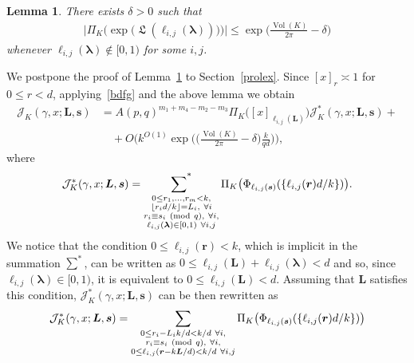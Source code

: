 \documentclass[11pt]{amsart}
\newcommand{\br}{{\boldsymbol r}}
\newcommand{\J}{\mathcal{J}}
\renewcommand{\mod}[1]{~\pr{\textnormal{mod}~#1}}
\newtheorem{lemma}{Lemma}
\theoremstyle{definition}
\newcommand{\ssum}[1]{\sum_{\substack{#1}}}
\newcommand{\ssumstar}[1]{\operatornamewithlimits{\sum\nolimits^*}_{\substack{#1}}}
\newcommand{\pr}[1]{\mathchoice{\left( #1\right)}{(#1)}{(#1)}{(#1)}}
\newcommand{\floor}[1]{{\left\lfloor {#1} \right\rfloor}}
\DeclareMathOperator{\Lie}{{\mathfrak L}}
\DeclareMathOperator{\Vol}{Vol}
\newcommand{\bs}{\boldsymbol }
\newcommand{\1}{{\mathbf 1}}
\let\originalleft\left
\let\originalright\right
\renewcommand{\left}{\mathopen{}\mathclose\bgroup\originalleft}
\renewcommand{\right}{\aftergroup\egroup\originalright}
\numberwithin{equation}{section}
\begin{document}
\begin{lemma}\label{extra_terms}
  There exists $\delta>0$ such that
  \begin{align*}
    \bigg|\Pi_K\big(\exp\big(\Lie(\ell_{i,j}(\bs \lambda))\big) \big)\bigg| \leq  \exp\Big(\frac{\Vol(K)}{2\pi}-\delta\Big)
  \end{align*}
  whenever $\ell_{i,j}(\bs \lambda)\notin[0,1)$ for some $i,j$.
\end{lemma}

We postpone the proof of Lemma~\ref{extra_terms} to Section~\ref{prolex}. Since $[x]_{r}\asymp 1$ for $0\leq r<d$, applying~\eqref{bdfg}
and the above lemma we obtain
\begin{equation}
  \begin{split}\label{reme}
    \J_K(\gamma, x ; \boldsymbol L,\boldsymbol s) &=  A(p,q)^{m_1+m_4-m_2-m_3}
    \Pi_K\big([ x]_{ \ell_{i,j}(\boldsymbol L) }\big)
    \J^*_K(\gamma, x; \boldsymbol L,\boldsymbol s)+{}\\
    &\quad+O\bigg(k^{O(1)}\exp\Big(\Big(\frac{\Vol(K)}{2\pi}-\delta\Big)\frac{k}{qd}\Big)\bigg),
  \end{split}
\end{equation}
where
\begin{align*}
  \J^*_K(\gamma, x; \boldsymbol L,\boldsymbol s) =    \ssumstar{0\leq r_1,\dots, r_m<k,\\  \floor{r_i d/k}=L_i,\ \forall i\\ r_i\equiv s_i \mod{q},\ \forall i,\\ 
    \ell_{i,j}(\bs \lambda)\in[0,1)\ \forall i,j }
  \Pi_K\big(\Phi_{\ell_{i,j}(\boldsymbol s)}(\{\ell_{i,j}(\boldsymbol r) d/k\})\big).
\end{align*}
We notice that the condition $0\leq \ell_{i,j}(\br)<k$, which is implicit in the summation $\sum^*$, can be written as $0\leq \ell_{i,j}(\bs L)+\ell_{i,j}(\bs \lambda)<d$ and so, since $\ell_{i,j}(\bs \lambda)\in[0,1)$, it is equivalent to $0\leq \ell_{i,j}(\bs L)<d$. Assuming that $\bs L$ satisfies this condition, $\J^*_K(\gamma, x; \boldsymbol L,\boldsymbol s)$ can be then rewritten as 
\begin{align*}
  \J^{*}_K(\gamma, x; \boldsymbol L,\boldsymbol s) =    \ssum{0 \leq r_i-L_i k/d< k/d\ \forall i,\\  r_i\equiv s_i \mod{q},\ \forall i,\\ 
    0\leq \ell_{i,j}(\br -k \bs L/d)<k/d\ \forall i,j }
  \Pi_K\big(\Phi_{\ell_{i,j}(\boldsymbol s)}(\{\ell_{i,j}(\boldsymbol r) d/k\})\big)
\end{align*}
\end{document}
